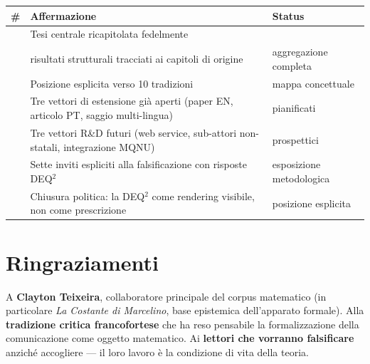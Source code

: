 {\def\LTcaptype{none} %
{\small\begin{longtable}[]{@{}
  >{\raggedright\arraybackslash}p{}
  >{\raggedright\arraybackslash}p{}
  >{\raggedright\arraybackslash}p{}@{}}
\toprule\noalign{}
\begin{minipage}[b]{\linewidth}\raggedright
\#
\end{minipage} & \begin{minipage}[b]{\linewidth}\raggedright
Affermazione
\end{minipage} & \begin{minipage}[b]{\linewidth}\raggedright
Status
\end{minipage} \\
\midrule\noalign{}
\endhead
\bottomrule\noalign{}
\endlastfoot
1 & Tesi centrale ricapitolata fedelmente & \Proved{} \\
2 & 21 risultati strutturali tracciati ai capitoli di origine &
\Proved{} aggregazione completa \\
3 & Posizione esplicita verso 10 tradizioni & \Hypoth{} mappa
concettuale \\
4 & Tre vettori di estensione già aperti (paper EN, articolo PT, saggio
multi-lingua) & \Proved{} pianificati \\
5 & Tre vettori R\&D futuri (web service, sub-attori non-statali,
integrazione MQNU) & \Conj{} prospettici \\
6 & Sette inviti espliciti alla falsificazione con risposte DEQ$^2$ &
\Hypoth{} esposizione metodologica \\
7 & Chiusura politica: la DEQ$^2$ come rendering visibile, non come
prescrizione & \Hypoth{} posizione esplicita \\
\end{longtable}}
}



\section{Ringraziamenti}\label{ringraziamenti}

A \textbf{Clayton Teixeira}, collaboratore principale del corpus
matematico (in particolare \emph{La Costante di Marcelino}, base
epistemica dell'apparato formale). Alla \textbf{tradizione critica
francofortese} che ha reso pensabile la formalizzazione della
comunicazione come oggetto matematico. Ai \textbf{lettori che vorranno
falsificare} anziché accogliere --- il loro lavoro è la condizione di
vita della teoria.


